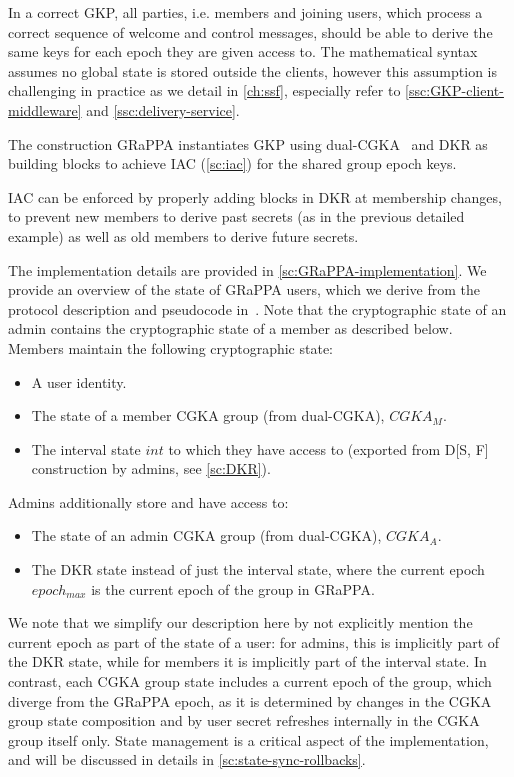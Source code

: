 In a correct GKP, all parties, i.e. members and joining users, which process a correct
sequence of welcome and control messages, should be able to derive the same keys
for each epoch they are given access to. The mathematical syntax assumes
no global state is stored outside the clients, however this assumption is challenging
in practice as we detail in \cref{ch:ssf},
especially refer to \cref{ssc:GKP-client-middleware} and \cref{ssc:delivery-service}.

The construction GRaPPA instantiates GKP using dual-CGKA~\cite{USENIX:BalColVau23}
and DKR \cite{GKP} as building blocks to achieve IAC (\cref{sc:iac}) for the shared group epoch keys.

IAC can be enforced by properly adding blocks in DKR at membership
changes, to prevent new members to derive past secrets (as in the previous detailed example)
as well as old members to derive future secrets.

The implementation details are provided in \cref{sc:GRaPPA-implementation}.
We provide an overview of the state of GRaPPA users, which we derive from the protocol description and pseudocode in~\cite{GKP}. 
Note that the cryptographic state of an admin contains the cryptographic state of a member as described below.
Members maintain the following cryptographic state:
\begin{itemize}
    \item A user identity.
    \item The state of a member CGKA group (from dual-CGKA), $CGKA_M$.
    \item The interval state $int$ to which they have access to (exported from D[S, F] construction by admins, see \cref{sc:DKR}).
\end{itemize}
Admins additionally store and have access to:
\begin{itemize}
    \item The state of an admin CGKA group (from dual-CGKA), $CGKA_A$.
    \item The DKR state instead of just the interval state, where the current epoch $epoch_{max}$ is the current epoch of the group in GRaPPA.
\end{itemize}
We note that we simplify our description here by not explicitly mention the current epoch as part of the state of a user:
for admins, this is implicitly part of the DKR state, while for members it is implicitly part of the interval state.
In contrast, each CGKA group state includes a current epoch of the group,
which diverge from the GRaPPA epoch, as it is determined by changes in
the CGKA group state composition and by user secret refreshes internally in the
CGKA group itself only. State management is a critical aspect 
of the implementation, and will be discussed in details in \cref{sc:state-sync-rollbacks}.

